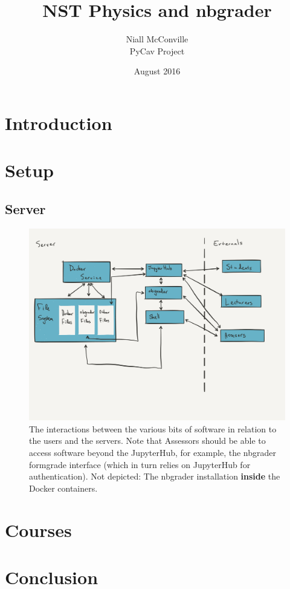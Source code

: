 \documentclass{report}
\title{NST Physics and nbgrader}
\author{Niall McConville \\ PyCav Project}
\date{August 2016}
\begin{document}
\maketitle

\tableofcontents{}

\chapter{Introduction}
   
   
\chapter{Setup}
    
    
    \section{Server}
        \begin{figure}[htb]
            \centering
            \includegraphics[width=0.9\linewidth]{setup/files/server_setup.png}
            \caption{The interactions between the various bits of software in relation to the users and the servers. Note that Assessors should be able to access software beyond the JupyterHub, for example, the nbgrader formgrade interface (which in turn relies on JupyterHub for authentication). Not depicted: The nbgrader installation \textbf{inside} the Docker containers.}
            \label{fig:server}
        \end{figure}

\chapter{Courses}
   
   
   
\chapter{Conclusion}
    
\end{document}
